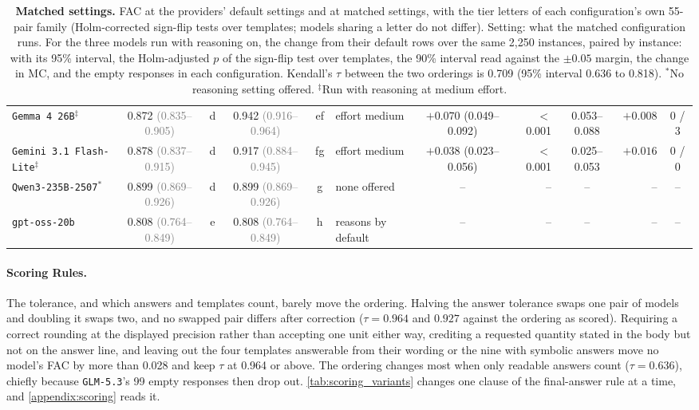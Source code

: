 \begin{table}[t]
{\begin{tabular}{l c c c c l c r c r c}
\texttt{Gemma 4 26B}$^{\ddagger}$ & 0.872 {\scriptsize\textcolor{gray}{(0.835--0.905)}} & d & 0.942 {\scriptsize\textcolor{gray}{(0.916--0.964)}} & ef & effort medium & $+0.070$ (0.049--0.092) & $<$0.001 & 0.053--0.088 & $+0.008$ & 0 / 3 \\
\texttt{Gemini 3.1 Flash-Lite}$^{\ddagger}$ & 0.878 {\scriptsize\textcolor{gray}{(0.837--0.915)}} & d & 0.917 {\scriptsize\textcolor{gray}{(0.884--0.945)}} & fg & effort medium & $+0.038$ (0.023--0.056) & $<$0.001 & 0.025--0.053 & $+0.016$ & 0 / 0 \\
\texttt{Qwen3-235B-2507}$^{\ast}$ & 0.899 {\scriptsize\textcolor{gray}{(0.869--0.926)}} & d & 0.899 {\scriptsize\textcolor{gray}{(0.869--0.926)}} & g & none offered & -- & -- & -- & -- & -- \\
\texttt{gpt-oss-20b} & 0.808 {\scriptsize\textcolor{gray}{(0.764--0.849)}} & e & 0.808 {\scriptsize\textcolor{gray}{(0.764--0.849)}} & h & reasons by default & -- & -- & -- & -- & -- \\
\bottomrule
\end{tabular}
}
\caption{\textbf{Matched settings.} FAC at the providers' default settings and at matched settings,
with the tier letters of each configuration's own 55-pair family (Holm-corrected sign-flip tests
over templates; models sharing a letter do not differ). Setting: what the matched configuration
runs. For the three models run with reasoning on, the change from their default rows over the same
2,250 instances, paired by instance: with its 95\% interval, the Holm-adjusted $p$ of the sign-flip
test over templates, the 90\% interval read against the $\pm 0.05$ margin, the change in MC, and the
empty responses in each configuration. Kendall's $\tau$ between the two orderings is 0.709 (95\%
interval 0.636 to 0.818). $^{\ast}$No reasoning setting offered. $^{\ddagger}$Run with reasoning at
medium effort.}
\label{tab:matched}
\end{table}

\paragraph{Scoring Rules.} The tolerance, and which answers and templates count, barely move the
ordering.
Halving the answer tolerance swaps one pair of models and doubling it swaps two, and no swapped pair
differs after correction ($\tau = 0.964$ and $0.927$ against the ordering as scored).
Requiring a correct rounding at the displayed precision rather than accepting one unit either way,
crediting a requested quantity stated in the body but not on the answer line, and leaving out the
four templates answerable from their wording or the nine with symbolic answers move no model's FAC
by more than 0.028 and keep $\tau$ at 0.964 or above.
The ordering changes most when only readable answers count ($\tau = 0.636$), chiefly because
\texttt{GLM-5.3}'s 99 empty responses then drop out.
\autoref{tab:scoring_variants} changes one clause of the final-answer rule at a time, and
\autoref{appendix:scoring} reads it.

